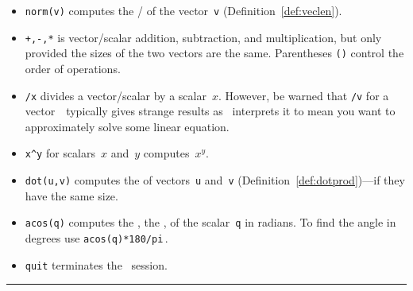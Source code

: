 \begin{table}
\begin{minipage}{\linewidth}
\begin{itemize}
\item {}\verb|norm(v)| computes the \slash {} of the vector~\verb|v| (Definition~\ref{def:veclen}).

\item {}\verb|+,-,*| is vector\slash scalar addition, subtraction, and multiplication, but only provided the sizes of the two vectors are the same.
Parentheses \verb|()| control the order of operations.

\item {}\verb|/x| divides a vector\slash scalar by a scalar~\(x\).
However, be warned that \verb|/v| for a vector~\vv\ typically gives strange results as \script\ interprets it to mean you want to approximately solve some linear equation.

\item {}\verb|x^y| for scalars~\(x\) and~\(y\) computes~\(x^y\).

\item {}\verb|dot(u,v)| computes the  of vectors~\verb|u| and~\verb|v| (Definition~\ref{def:dotprod})---if they have the same size.

\item {}\verb|acos(q)| computes the , the , of the scalar~\verb|q| in radians.  To find the angle in degrees use \verb|acos(q)*180/pi|\,.

\item {}\verb|quit| terminates the \script\ session.
\end{itemize}
\end{minipage}
\hrule
\end{table}




